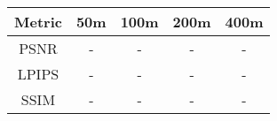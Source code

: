 \begin{table}[h] 
\centering
\begin{tabular}{ccccc}
\hline
Metric & 50m & 100m & 200m & 400m \\ \hline
PSNR   & -   & -    & -    & -    \\
LPIPS  & -   & -    & -    & -    \\
SSIM   & -   & -    & -    & -    \\ \hline
\end{tabular}
\label{tab:area-size}
\end{table}